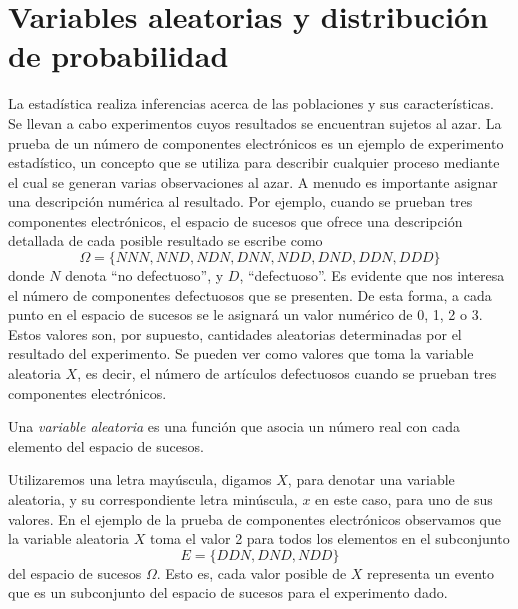 \section{Variables aleatorias y distribución de probabilidad}

La estadística realiza inferencias acerca de las poblaciones y sus características. Se llevan a cabo experimentos cuyos resultados se encuentran sujetos al azar. La prueba de un número de componentes electrónicos es un ejemplo de experimento estadístico, un concepto que se utiliza para describir cualquier proceso mediante el cual se generan varias observaciones al azar. A menudo es importante asignar una descripción numérica al resultado. Por ejemplo, cuando se prueban tres componentes electrónicos, el espacio de sucesos que ofrece una descripción detallada de cada posible resultado se escribe como
$$\Omega = \{ NNN, NND, NDN, DNN, NDD, DND, DDN, DDD \}$$
donde $N$ denota “no defectuoso”, y $D$, “defectuoso”. Es evidente que nos interesa el número de componentes defectuosos que se presenten. De esta forma, a cada punto en el espacio de sucesos se le asignará un valor numérico de 0, 1, 2 o 3. Estos valores son, por supuesto, cantidades aleatorias determinadas por el resultado del experimento. Se pueden ver como valores que toma la variable aleatoria $X$, es decir, el número de artículos defectuosos cuando se prueban tres componentes electrónicos.

\begin{definicion}{}{}
    Una \emph{variable aleatoria} es una función que asocia un número real con cada elemento del espacio de sucesos.
\end{definicion}

\newpage

Utilizaremos una letra mayúscula, digamos $X$, para denotar una variable aleatoria, y su correspondiente letra minúscula, $x$ en este caso, para uno de sus valores. En el ejemplo de la prueba de componentes electrónicos observamos que la variable aleatoria $X$ toma el valor 2 para todos los elementos en el subconjunto
$$E = \{ DDN, DND, NDD \}$$
del espacio de sucesos $\Omega$. Esto es, cada valor posible de $X$ representa un evento que es un subconjunto del espacio de sucesos para el experimento dado.

